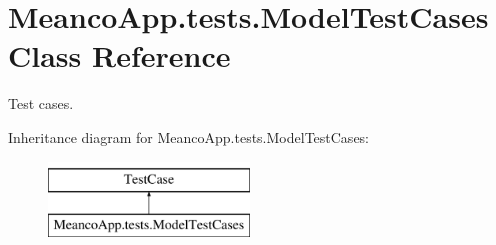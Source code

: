 \hypertarget{class_meanco_app_1_1tests_1_1_model_test_cases}{}\section{Meanco\+App.\+tests.\+Model\+Test\+Cases Class Reference}
\label{class_meanco_app_1_1tests_1_1_model_test_cases}


Test cases.  


Inheritance diagram for Meanco\+App.\+tests.\+Model\+Test\+Cases\+:\begin{figure}[H]
\begin{center}
\leavevmode
\includegraphics[height=2.000000cm]{class_meanco_app_1_1tests_1_1_model_test_cases}
\end{center}
\end{figure}
